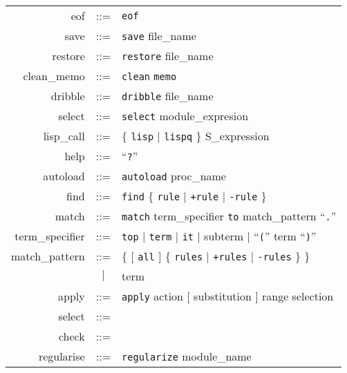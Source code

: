 \documentclass[a4paper]{memoir}
\begin{document}
\begin{tabular}{r c l}
  eof &::=& \verb|eof| \\
  save &::=& \verb|save| file\_name \\
  restore &::=& \verb|restore| file\_name \\
  clean\_memo &::=& \verb|clean| \verb|memo| \\
  dribble &::=& \verb|dribble| file\_name \\
  select &::=& \verb|select| module\_expresion \\
  lisp\_call &::=& $\{$ \verb|lisp| $|$ \verb|lispq| $\}$ S\_expression \\
  help &::=& ``\verb|?|'' \\
  autoload &::=& \verb|autoload| proc\_name \\
  find &::=& \verb|find| $\{$ \verb|rule| $|$ \verb|+rule| $|$ \verb|-rule|
    $\}$ \\
  match &::=& \verb|match| term\_specifier \verb|to| match\_pattern
    ``\verb|.|'' \\
  term\_specifier &::=& \verb|top| $|$ \verb|term| $|$ \verb|it| $|$ subterm
    $|$ ``\verb|(|'' term ``\verb|)|'' \\
  match\_pattern &::=& $\{$ $[$ \verb|all| $]$
    $\{$ \verb|rules| $|$ \verb|+rules| $|$ \verb|-rules| $\}$ $\}$ \\
    &$|$& term \\
  apply &::=& \verb|apply| action $[$ substitution $]$ range selection \\
  select &::=& \\
  check &::=& \\
  regularise &::=& \verb|regularize| module\_name \\
\end{tabular}
\textrm{}

\end{document}

